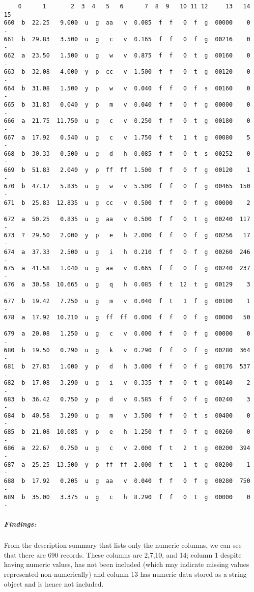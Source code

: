 \documentclass[11pt]{article}
\begin{document}
    \begin{verbatim}
    0      1       2  3  4   5   6      7  8  9   10 11 12     13   14 15
660  b  22.25   9.000  u  g  aa   v  0.085  f  f   0  f  g  00000    0  -
661  b  29.83   3.500  u  g   c   v  0.165  f  f   0  f  g  00216    0  -
662  a  23.50   1.500  u  g   w   v  0.875  f  f   0  t  g  00160    0  -
663  b  32.08   4.000  y  p  cc   v  1.500  f  f   0  t  g  00120    0  -
664  b  31.08   1.500  y  p   w   v  0.040  f  f   0  f  s  00160    0  -
665  b  31.83   0.040  y  p   m   v  0.040  f  f   0  f  g  00000    0  -
666  a  21.75  11.750  u  g   c   v  0.250  f  f   0  t  g  00180    0  -
667  a  17.92   0.540  u  g   c   v  1.750  f  t   1  t  g  00080    5  -
668  b  30.33   0.500  u  g   d   h  0.085  f  f   0  t  s  00252    0  -
669  b  51.83   2.040  y  p  ff  ff  1.500  f  f   0  f  g  00120    1  -
670  b  47.17   5.835  u  g   w   v  5.500  f  f   0  f  g  00465  150  -
671  b  25.83  12.835  u  g  cc   v  0.500  f  f   0  f  g  00000    2  -
672  a  50.25   0.835  u  g  aa   v  0.500  f  f   0  t  g  00240  117  -
673  ?  29.50   2.000  y  p   e   h  2.000  f  f   0  f  g  00256   17  -
674  a  37.33   2.500  u  g   i   h  0.210  f  f   0  f  g  00260  246  -
675  a  41.58   1.040  u  g  aa   v  0.665  f  f   0  f  g  00240  237  -
676  a  30.58  10.665  u  g   q   h  0.085  f  t  12  t  g  00129    3  -
677  b  19.42   7.250  u  g   m   v  0.040  f  t   1  f  g  00100    1  -
678  a  17.92  10.210  u  g  ff  ff  0.000  f  f   0  f  g  00000   50  -
679  a  20.08   1.250  u  g   c   v  0.000  f  f   0  f  g  00000    0  -
680  b  19.50   0.290  u  g   k   v  0.290  f  f   0  f  g  00280  364  -
681  b  27.83   1.000  y  p   d   h  3.000  f  f   0  f  g  00176  537  -
682  b  17.08   3.290  u  g   i   v  0.335  f  f   0  t  g  00140    2  -
683  b  36.42   0.750  y  p   d   v  0.585  f  f   0  f  g  00240    3  -
684  b  40.58   3.290  u  g   m   v  3.500  f  f   0  t  s  00400    0  -
685  b  21.08  10.085  y  p   e   h  1.250  f  f   0  f  g  00260    0  -
686  a  22.67   0.750  u  g   c   v  2.000  f  t   2  t  g  00200  394  -
687  a  25.25  13.500  y  p  ff  ff  2.000  f  t   1  t  g  00200    1  -
688  b  17.92   0.205  u  g  aa   v  0.040  f  f   0  f  g  00280  750  -
689  b  35.00   3.375  u  g   c   h  8.290  f  f   0  t  g  00000    0  -
    \end{verbatim}

    
    \hypertarget{findings}{%
\subparagraph{Findings:}\label{findings}}

From the description summary that lists only the numeric columns, we can
see that there are 690 records. These columns are 2,7,10, and 14; column
1 despite having numeric values, has not been included (which may
indicate missing values represented non-numerically) and column 13 has
numeric data stored as a string object and is hence not included.
\end{document}
